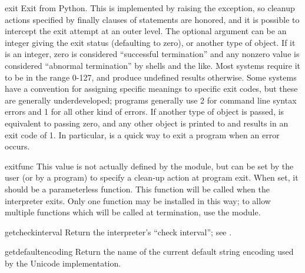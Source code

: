 \begin{funcdesc}{exit}{}
  Exit from Python.  This is implemented by raising the
   exception, so cleanup actions specified by
  finally clauses of  statements are honored, and it is
  possible to intercept the exit attempt at an outer level.  The
  optional argument  can be an integer giving the exit status
  (defaulting to zero), or another type of object.  If it is an
  integer, zero is considered ``successful termination'' and any
  nonzero value is considered ``abnormal termination'' by shells and
  the like.  Most systems require it to be in the range 0-127, and
  produce undefined results otherwise.  Some systems have a convention
  for assigning specific meanings to specific exit codes, but these
  are generally underdeveloped; \UNIX{} programs generally use 2 for
  command line syntax errors and 1 for all other kind of errors.  If
  another type of object is passed,  is equivalent to
  passing zero, and any other object is printed to 
  and results in an exit code of 1.  In particular,
   is a quick way to exit a
  program when an error occurs.
\end{funcdesc}

\begin{datadesc}{exitfunc}
  This value is not actually defined by the module, but can be set by
  the user (or by a program) to specify a clean-up action at program
  exit.  When set, it should be a parameterless function.  This
  function will be called when the interpreter exits.  Only one
  function may be installed in this way; to allow multiple functions
  which will be called at termination, use the 
  module.  
\end{datadesc}

\begin{funcdesc}{getcheckinterval}{}
  Return the interpreter's ``check interval'';
  see .
\end{funcdesc}

\begin{funcdesc}{getdefaultencoding}{}
  Return the name of the current default string encoding used by the
  Unicode implementation.
\end{funcdesc}

